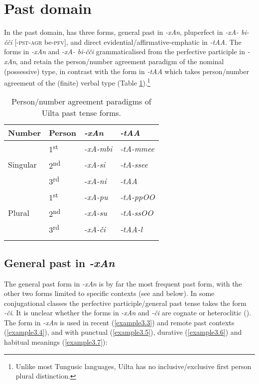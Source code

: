 \documentclass[output=paper,colorlinks,citecolor=brown]{langscibook}
\begin{document}
\section{Past domain}\label{Section3.3}

In the past domain,  has three forms, general past in \textit{-xAn}, pluperfect in \textit{\nobreakdash-xA- bi-čči} [-\textsc{pst}-\textsc{agr} be-\textsc{pfv}], and direct evidential/affirmative-emphatic in \textit{-tAA}. The forms in \textit{-xAn} and \textit{-xA- bi-čči} grammaticalised from the perfective participle in \textit{-xAn}, and retain the person/number agreement paradigm of the nominal (possessive) type, in contrast with the form in \textit{-tAA} which takes person/number agreement of the (finite) verbal type (Table \ref{table:3}).\footnote{Unlike most Tungusic languages, Uilta has no inclusive/exclusive first person plural distinction.}

\begin{table}
\caption{Person/number agreement paradigms of Uilta past tense forms.}
\label{table:3}
 \begin{tabular}{llll}
  \lsptoprule
    Number        & Person & \textit{-xAn} & \textit{-tAA}\\
  \midrule
  &   1\textsuperscript{st}  &   \textit{-xA-mbi}      & \textit{-tA-mmee}\\
  Singular  &   2\textsuperscript{nd}  &   \textit{-xA-si}      & \textit{-tA-ssee}\\
  &   3\textsuperscript{rd}  &   \textit{-xA-ni}      & \textit{-tAA}\\
  \midrule
  &   1\textsuperscript{st}  &   \textit{-xA-pu}      & \textit{-tA-ppOO}\\
  Plural  &  2\textsuperscript{nd}  &    \textit{-xA-su}      & \textit{-tA-ssOO}\\
  &   3\textsuperscript{rd}  &   \textit{-xA-či}      & \textit{-tAA-l}\\
  \lspbottomrule
 \end{tabular}
\end{table}

\subsection{General past in \textit{-xAn}}\label{Section3.3.1}\largerpage

The general past form in \textit{-xAn} is by far the most frequent past form, with the other two forms limited to specific contexts (see  and  below). In some conjugational classes the perfective participle/general past tense takes the form \textit{-či}. It is unclear whether the forms in \textit{-xAn} and \textit{-či} are cognate or heteroclitic (\citealt{Malchukov_2000}). The form in \textit{-xAn} is used in recent (\ref{example3.3}) and remote past contexts (\ref{example3.4}), and with punctual (\ref{example3.5}), durative (\ref{example3.6}) and habitual meanings (\ref{example3.7}):
\end{document}
